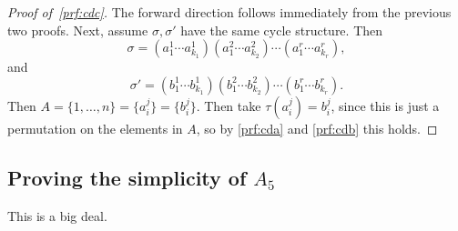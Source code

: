 \begin{proof}[Proof of\/~\ref{prf:cdc}]
The forward direction follows immediately from the previous two proofs.
Next, assume $\sigma, \sigma'$ have the same cycle structure. Then \[\sigma = (a_1^1 \cdots a_{k_1}^1)(a_1^2 \cdots a_{k_2}^2) \cdots (a_1^r \cdots a_{k_r}^r),\] and \[\sigma' = (b_1^1 \cdots b_{k_1}^1)(b_1^2 \cdots b_{k_2}^2) \cdots (b_1^r \cdots b_{k_r}^r).\] Then $A = \{1, \dotsc, n\} = \{a_i^j\} = \{b_i^j\}$. Then take $\tau(a_i^j) = b_i^j$, since this is just a permutation on the elements in $A$, so by \ref{prf:cda} and \ref{prf:cdb} this holds.
\end{proof}

\subsection{Proving the simplicity of \texorpdfstring{$A_5$}{A5}}

This is a big deal.

